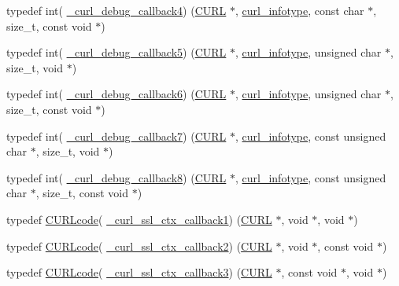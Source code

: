 \begin{DoxyCompactItemize}
\item 
typedef int( \hyperlink{typecheck-gcc_8h_a8577cd6fbe76c09f0e0242d94f842651}{\+\_\+curl\+\_\+debug\+\_\+callback4}) (\hyperlink{curl_8h_ace655e3633b6533591283994d6b5cdda}{C\+U\+RL} $\ast$, \hyperlink{curl_8h_a9704d2633927f77efaa3e3c6f1c23a14}{curl\+\_\+infotype}, const char $\ast$, size\+\_\+t, const void $\ast$)
\item 
typedef int( \hyperlink{typecheck-gcc_8h_a413cefc946d02050fd8ed446fb16d4af}{\+\_\+curl\+\_\+debug\+\_\+callback5}) (\hyperlink{curl_8h_ace655e3633b6533591283994d6b5cdda}{C\+U\+RL} $\ast$, \hyperlink{curl_8h_a9704d2633927f77efaa3e3c6f1c23a14}{curl\+\_\+infotype}, unsigned char $\ast$, size\+\_\+t, void $\ast$)
\item 
typedef int( \hyperlink{typecheck-gcc_8h_a125129a4ee026e1ba2ea8bffc369e894}{\+\_\+curl\+\_\+debug\+\_\+callback6}) (\hyperlink{curl_8h_ace655e3633b6533591283994d6b5cdda}{C\+U\+RL} $\ast$, \hyperlink{curl_8h_a9704d2633927f77efaa3e3c6f1c23a14}{curl\+\_\+infotype}, unsigned char $\ast$, size\+\_\+t, const void $\ast$)
\item 
typedef int( \hyperlink{typecheck-gcc_8h_ae964409993dea78229a06595a232b8c6}{\+\_\+curl\+\_\+debug\+\_\+callback7}) (\hyperlink{curl_8h_ace655e3633b6533591283994d6b5cdda}{C\+U\+RL} $\ast$, \hyperlink{curl_8h_a9704d2633927f77efaa3e3c6f1c23a14}{curl\+\_\+infotype}, const unsigned char $\ast$, size\+\_\+t, void $\ast$)
\item 
typedef int( \hyperlink{typecheck-gcc_8h_a5c3caa775cdc5419a7934129fe16eae8}{\+\_\+curl\+\_\+debug\+\_\+callback8}) (\hyperlink{curl_8h_ace655e3633b6533591283994d6b5cdda}{C\+U\+RL} $\ast$, \hyperlink{curl_8h_a9704d2633927f77efaa3e3c6f1c23a14}{curl\+\_\+infotype}, const unsigned char $\ast$, size\+\_\+t, const void $\ast$)
\item 
typedef \hyperlink{curl_8h_af0691941698240652e0a391394217951}{C\+U\+R\+Lcode}( \hyperlink{typecheck-gcc_8h_a05c55b1e4b35247bffa0fbe08d41ad38}{\+\_\+curl\+\_\+ssl\+\_\+ctx\+\_\+callback1}) (\hyperlink{curl_8h_ace655e3633b6533591283994d6b5cdda}{C\+U\+RL} $\ast$, void $\ast$, void $\ast$)
\item 
typedef \hyperlink{curl_8h_af0691941698240652e0a391394217951}{C\+U\+R\+Lcode}( \hyperlink{typecheck-gcc_8h_adc0ea99771e27458c834d1d6f8bdcc22}{\+\_\+curl\+\_\+ssl\+\_\+ctx\+\_\+callback2}) (\hyperlink{curl_8h_ace655e3633b6533591283994d6b5cdda}{C\+U\+RL} $\ast$, void $\ast$, const void $\ast$)
\item 
typedef \hyperlink{curl_8h_af0691941698240652e0a391394217951}{C\+U\+R\+Lcode}( \hyperlink{typecheck-gcc_8h_aa175d06eb00c16e50b97f65abe59d620}{\+\_\+curl\+\_\+ssl\+\_\+ctx\+\_\+callback3}) (\hyperlink{curl_8h_ace655e3633b6533591283994d6b5cdda}{C\+U\+RL} $\ast$, const void $\ast$, void $\ast$)

\end{DoxyCompactItemize}
